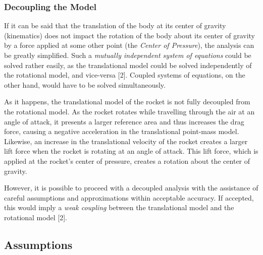 \documentclass[]{article}
\begin{document}
\subsubsection{Decoupling the Model}\label{decoupling-the-model}

If it can be said that the translation of the body at its center of
gravity (kinematics) does not impact the rotation of the body about its
center of gravity by a force applied at some other point (the
\emph{Center of Pressure}), the analysis can be greatly simplified. Such
a \emph{mutually independent system of equations} could be solved rather
easily, as the translational model could be solved independently of the
rotational model, and vice-versa {[}2{]}. Coupled systems of equations,
on the other hand, would have to be solved simultaneously.

As it happens, the translational model of the rocket is not fully
decoupled from the rotational model. As the rocket rotates while
travelling through the air at an angle of attack, it presents a larger
reference area and thus increases the drag force, causing a negative
acceleration in the translational point-mass model. Likewise, an
increase in the translational velocity of the rocket creates a larger
lift force when the rocket is rotating at an angle of attack. This lift
force, which is applied at the rocket's center of pressure, creates a
rotation about the center of gravity.

However, it is possible to proceed with a decoupled analysis with the
assistance of careful assumptions and approximations within acceptable
accuracy. If accepted, this would imply a \emph{weak coupling} between
the translational model and the rotational model {[}2{]}.

\subsection{Assumptions}\label{assumptions}
\end{document}
